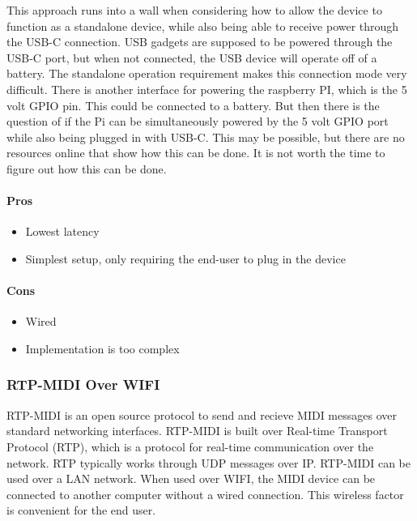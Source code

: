This approach runs into a wall when considering how to allow the device to function as a
standalone device, while also being able to receive power through the USB-C connection.
USB gadgets are supposed to be powered through the USB-C port, but when not connected, the
USB device will operate off of a battery. The standalone operation requirement makes this
connection mode very difficult. There is another interface for powering the raspberry PI,
which is the 5 volt GPIO pin. This could be connected to a battery. But then there is the
question of if the Pi can be simultaneously powered by the 5 volt GPIO port while also
being plugged in with USB-C. This may be possible, but there are no resources online that
show how this can be done. It is not worth the time to figure out how this can be done.

\paragraph{Pros}

\begin{itemize}
  \item Lowest latency
  \item Simplest setup, only requiring the end-user to plug in the device
\end{itemize}

\paragraph{Cons}

\begin{itemize}
  \item Wired
  \item Implementation is too complex
\end{itemize}

\subsubsection{RTP-MIDI Over WIFI}

RTP-MIDI is an open source protocol to send and recieve MIDI messages over standard
networking interfaces. RTP-MIDI is built over Real-time Transport Protocol (RTP), which is
a protocol for real-time communication over the network. RTP typically works through UDP
messages over IP. RTP-MIDI can be used over a LAN network. When used over WIFI, the MIDI
device can be connected to another computer without a wired connection. This wireless
factor is convenient for the end user.

